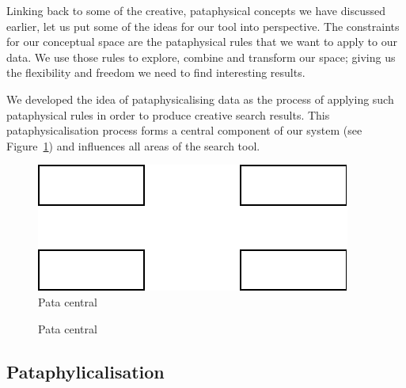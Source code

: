 \begin{draft}
  Linking back to some of the creative, pataphysical concepts we have discussed earlier, let us put some of the ideas for our tool into perspective. The constraints for our conceptual space are the pataphysical rules that we want to apply to our data. We use those rules to explore, combine and transform our space; giving us the flexibility and freedom we need to find interesting results.

  We developed the idea of pataphysicalising data as the process of applying such pataphysical rules in order to produce creative search results. This pataphysicalisation process forms a central component of our system (see Figure~\ref{fig:patasearch01}) and influences all areas of the search tool.


  \begin{figure}[htb] %
    \centering
    \includegraphics[width=\linewidth]{images/patasearch01}
  \caption[Pata central]{Pata central}
  \label{fig:patasearch01}
  \end{figure}

  \begin{figure}[htb] %
    \centering
    
  \caption[Pata central]{Pata central}
  \label{fig:patasearch02}
  \end{figure}
\end{draft}


\subsection{Pataphylicalisation}


